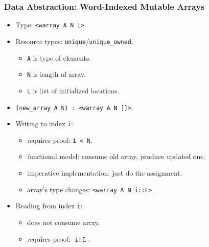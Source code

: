 \documentclass[10pt]{beamer}
\begin{document}
\begin{frame}
\frametitle{Data Abstraction: Word-Indexed Mutable Arrays}

\begin{itemize}
\item Type: \texttt{<warray A N L>}.
\item Resource types: \texttt{unique}/\texttt{unique\_owned}.
\begin{itemize}
\item \texttt{A} is type of elements.
\item \texttt{N} is length of array.
\item \texttt{L} is list of initialized locations.
\end{itemize}

\item \texttt{(new\_array A N) : <warray A N []>}.

\item Writing to index \texttt{i}: 
\begin{itemize}
\item requires proof: \texttt{i < N}.
\item functional model: consume old array, produce updated one.
\item imperative implementation: just do the assignment.
\item array's type changes:  \texttt{<warray A N i::L>}.
\end{itemize}

\item Reading from index \texttt{i}:
\begin{itemize}
\item does not consume array.
\item requires proof: $\texttt{i}\in\texttt{L}$.
\end{itemize}
\end{itemize}
\end{frame}
\end{document}
